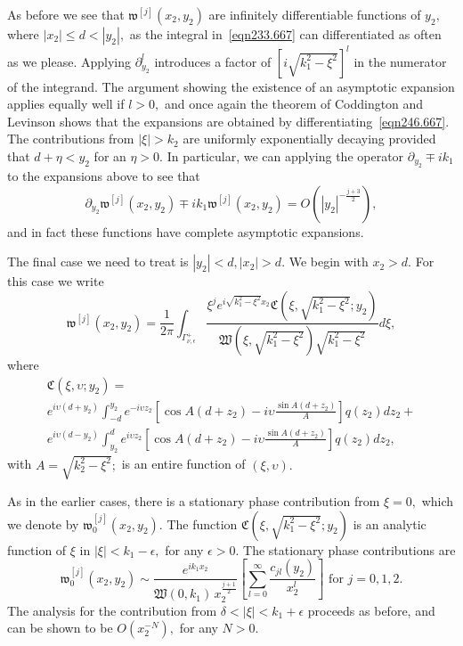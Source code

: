 \documentclass[11pt]{article}
\newcommand{\Bk}{\color{black}}
\newcommand{\Rd}{\color{black}}
\newcommand\fw{\mathfrak w}
\newcommand\fW{\mathfrak W}
\newcommand\fC{\mathfrak C}
\newcommand\pa{\partial}
\theoremstyle{definition}
\theoremstyle{remark}
\begin{document}
  \Rd As before we see that $\fw^{[j]}(x_2,y_2)$ are infinitely differentiable
  functions of $y_2,$ where $|x_2|\leq d<|y_2|,$ as the integral
  in~\eqref{eqn233.667} can differentiated as often as we please.  Applying
  $\pa_{y_2}^l$ introduces a factor of $[i\sqrt{k_1^2-\xi^2}]^l$ in the numerator
  of the integrand. The argument showing the existence of an asymptotic
  expansion applies equally well if $l>0,$ and once again the theorem of
  Coddington and Levinson shows that the expansions are obtained by
  differentiating~\eqref{eqn246.667}. The contributions from $|\xi|>k_2$ are
  uniformly exponentially decaying provided that $d+\eta<y_2$ for an
  $\eta>0.$ \Bk
  In particular, we can applying the operator $\pa_{y_2}\mp ik_1$ to the
  expansions above to see that
   \begin{equation}
     \pa_{y_2}\fw^{[j]}(x_2,y_2)\mp ik_1 \fw^{[j]}(x_2,y_2)=O\left(|y_2|^{-\frac{j+3}{2}}\right),
   \end{equation}
   and in fact these functions have complete asymptotic expansions.
   
   

   The final case we need to treat is $|y_2|<d, |x_2|>d.$ We begin with $x_2>d.$
   For this case we write
   \begin{equation}\label{eqn249.667}
     \fw^{[j]}(x_2,y_2)=
     \frac{1}{2\pi}\int_{\Gamma_{\nu,\epsilon}^+}\frac{\xi^j
       e^{i\sqrt{k_1^2-\xi^2}x_2}\fC(\xi,\sqrt{k_1^2-\xi^2};y_2)}
          {\fW(\xi,\sqrt{k_1^2-\xi^2})
       \sqrt{k_1^2-\xi^2}}d\xi,
   \end{equation}
   where
   \begin{multline}
     \fC(\xi,\upsilon;y_2)=\\
     e^{i\upsilon(d+y_2)}\int_{-d}^{y_2}e^{-i\upsilon z_2}\left[\cos
       A(d+z_2)-i\upsilon\frac{\sin A(d+z_2)}{A}\right]q(z_2)dz_2+\\
     e^{i\upsilon(d-y_2)}\int_{y_2}^{d}e^{i\upsilon z_2}\left[\cos
       A(d+z_2)-i\upsilon\frac{\sin A(d+z_2)}{A}\right]q(z_2)dz_2,
   \end{multline}
  with $A=\sqrt{k_2^2-\xi^2};$ is an entire function of $(\xi,\upsilon).$

   As in the earlier cases, there is a stationary phase contribution
   from $\xi=0,$ which we denote by $\fw^{[j]}_{0}(x_2,y_2).$ The function
   $\fC(\xi,\sqrt{k_1^2-\xi^2};y_2)$ is an analytic function of $\xi$ in
   $|\xi|<k_1-\epsilon,$ for any $\epsilon>0.$ The stationary phase
   contributions are
   \begin{equation}\label{eqn148.25}
     \fw^{[j]}_{0}(x_2,y_2)\sim
     \frac{e^{ik_1x_2}}{\fW(0,k_1)\,
       x_2^{\frac{j+1}{2}}}\left[\sum_{l=0}^{\infty}
       \frac{c_{jl}(y_2)}{x_2^l}\right]      \text{ for }j=0,1,2.
             \end{equation}
 The analysis for the contribution from $\delta<|\xi|<k_1+\epsilon$  proceeds as before,
 and can be shown to be $O(x_2^{-N}),$ for any $N>0.$
\end{document}
